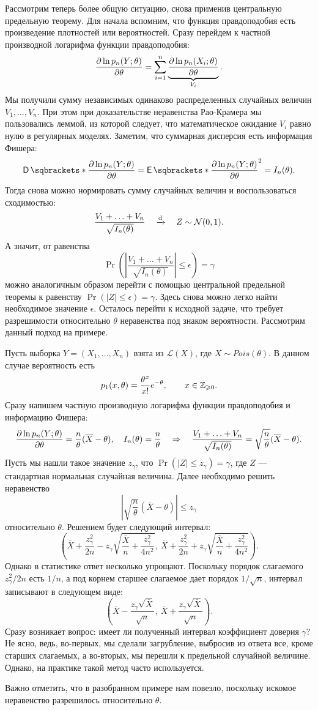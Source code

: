 Рассмотрим теперь более общую ситуацию, снова применив центральную предельную теорему.
Для начала вспомним, что функция правдоподобия есть произведение плотностей или вероятностей.
Сразу перейдем к частной производной логарифма функции правдоподобия:
\[
    \frac{\partial\ln p_n(Y; \theta)}{\partial \theta} = \sum_{i=1}^n \underbrace{\frac{\partial\ln p_n(X_i; \theta)}{\partial \theta}}_{V_i}.
\]
Мы получили сумму независимых одинаково распределенных случайных величин $V_1, \ldots, V_n$. При этом при доказательстве неравенства Рао-Крамера мы пользовались леммой, из которой следует, что математическое ожидание $V_i$ равно нулю в регулярных моделях.
Заметим, что суммарная дисперсия есть информация Фишера:
\[
    \D{\dlnpn{Y}} = \E{\dlnpn{Y}}^2 = I_n(\theta).
\]
Тогда снова можно нормировать сумму случайных величин и воспользоваться сходимостью:
\[
    \frac{V_1 + \ldots + V_n}{\sqrt{I_n(\theta)}} \quad \xrightarrow{\mathrm{d}} \quad Z \sim \mathcal{N}(0, 1).
\]
А значит, от равенства
\[
    \Pr\left( \left| \frac{V_1 + \ldots + V_n}{\sqrt{I_n(\theta)}} \right| \leqslant \epsilon \right) = \gamma
\]
можно аналогичным образом перейти с помощью центральной предельной теоремы к равенству $\Pr(|Z| \leqslant \epsilon) = \gamma$.
Здесь снова можно легко найти необходимое значение $\epsilon$. Осталось перейти к исходной задаче, что требует разрешимости относительно $\theta$ неравенства под знаком вероятности.
Рассмотрим данный подход на примере.
\begin{example}
    Пусть выборка $Y = (X_1, \ldots, X_n)$ взята из $\mathcal{L}(X)$, где $X \sim Pois(\theta)$. В данном случае вероятность есть
    \[
        p_1(x, \theta) = \frac{\theta^x}{x!}e^{-\theta}, \qquad x \in \mathbb{Z}_{\geqslant 0}.
    \]
    Сразу напишем частную производную логарифма функции правдоподобия и информацию Фишера:
    \[
        \frac{\partial\ln p_n(Y; \theta)}{\partial \theta} = \frac{n}{\theta}(\overline{X} - \theta), \quad I_n(\theta) = \frac{n}{\theta} \quad \Rightarrow \quad \frac{V_1 + \ldots + V_n}{\sqrt{I_n(\theta)}} = \sqrt{\frac{n}{\theta}}(\overline{X} - \theta).
    \]
    Пусть мы нашли такое значение $z_{\gamma}$, что $\Pr(|Z| \leqslant z_{\gamma}) = \gamma$, где $Z$ --- стандартная нормальная случайная величина.
    Далее необходимо решить неравенство
    \[
        \left|\sqrt{\frac{n}{\theta}}(\overline{X} - \theta)\right| \leqslant z_{\gamma}
    \]
относительно $\theta$. Решением будет следующий интервал:
    \[
        \left(\overline{X} + \frac{z_{\gamma}^2}{2n} - z_{\gamma}\sqrt{\frac{\overline{X}}{n} + \frac{z_{\gamma}^2}{4n^2}},\ \overline{X} + \frac{z_{\gamma}^2}{2n} + z_{\gamma}\sqrt{\frac{\overline{X}}{n} + \frac{z_{\gamma}^2}{4n^2}}\right).
    \]
    Однако в статистике ответ несколько упрощают.
    Поскольку порядок слагаемого $z_{\gamma}^2/2n$ есть $1/n$, а под корнем старшее слагаемое дает порядок $1/\sqrt{n}$, интервал записывают в следующем виде:
    \[
        \left(\overline{X} - \frac{z_{\gamma} \sqrt{\overline{X}}}{\sqrt{n}},\ \overline{X} + \frac{z_{\gamma} \sqrt{\overline{X}}}{\sqrt{n}}\right).
    \]
    Сразу возникает вопрос: имеет ли полученный интервал коэффициент доверия $\gamma$?
    Не ясно, ведь, во-первых, мы сделали загрубление, выбросив из ответа все, кроме старших слагаемых, а во-вторых, мы перешли к предельной случайной величине. Однако, на практике такой метод часто используется.
\end{example}

Важно отметить, что в разобранном примере нам повезло, поскольку искомое неравенство разрешилось относительно $\theta$.


